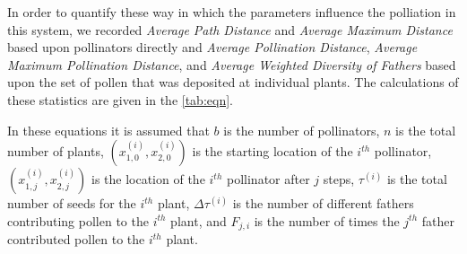 In order to quantify these way in which the parameters influence the polliation in this system, we recorded
\emph{Average Path Distance} and \emph{Average Maximum Distance} based upon pollinators directly and 
\emph{Average Pollination Distance}, \emph{Average Maximum Pollination Distance}, and \emph{Average
Weighted Diversity of Fathers} based upon the set of pollen that was deposited at individual plants.  
The calculations of these statistics are given in the \autoref{tab:eqn}.

In these equations it is assumed that $b$ is the number of pollinators, $n$ is the total number
of plants, $(x_{1,0}^{(i)},x_{2,0}^{(i)})$ is the starting location of the $i^{th}$ pollinator,
$(x_{1,j}^{(i)},x_{2,j}^{(i)})$ is the location of the $i^{th}$ pollinator after $j$ steps,
$\tau^{(i)}$ is the total number of seeds for the $i^{th}$ plant, $\Delta\tau^{(i)}$ is the number
of different fathers contributing pollen to the $i^{th}$ plant, and $F_{j,i}$ is the number of
times the $j^{th}$ father contributed pollen to the $i^{th}$ plant.

